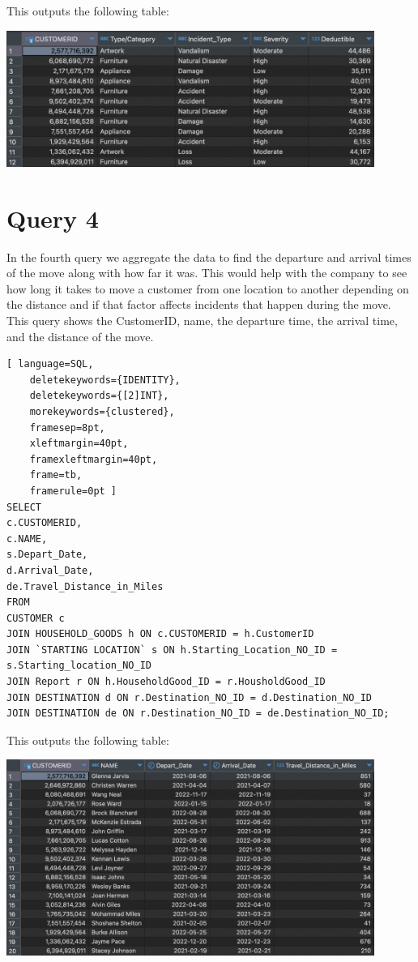 \documentclass{article}
\begin{document}
This outputs the following table:

\begin{center}
    \includegraphics[width=0.9\textwidth]{./images/Q3.png}
\end{center}

\section*{Query 4}

In the fourth query we aggregate the data to find the departure and arrival times of the move along with how far it was. This would help with the company to see how long it takes to move a customer from one location to another depending on the distance and if that factor affects incidents that happen during the move. This query shows the CustomerID, name, the departure time, the arrival time, and the distance of the move.

\begin{lstlisting}[ language=SQL,
    deletekeywords={IDENTITY},
    deletekeywords={[2]INT},
    morekeywords={clustered},
    framesep=8pt,
    xleftmargin=40pt,
    framexleftmargin=40pt,
    frame=tb,
    framerule=0pt ]
SELECT 
c.CUSTOMERID, 
c.NAME, 
s.Depart_Date, 
d.Arrival_Date,
de.Travel_Distance_in_Miles
FROM 
CUSTOMER c 
JOIN HOUSEHOLD_GOODS h ON c.CUSTOMERID = h.CustomerID 
JOIN `STARTING LOCATION` s ON h.Starting_Location_NO_ID = s.Starting_location_NO_ID
JOIN Report r ON h.HouseholdGood_ID = r.HousholdGood_ID 
JOIN DESTINATION d ON r.Destination_NO_ID = d.Destination_NO_ID
JOIN DESTINATION de ON r.Destination_NO_ID = de.Destination_NO_ID;
\end{lstlisting}

This outputs the following table:

\begin{center}
    \includegraphics[width=0.9\textwidth]{./images/Q4.png}
\end{center}
\end{document}
